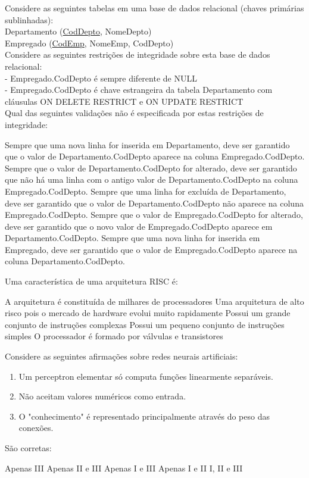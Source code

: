 \documentclass[12pt, addpoints]{exam}
\begin{document}
\begin{questions}
\question
Considere as seguintes tabelas em uma base de dados relacional (chaves primárias sublinhadas):\\
Departamento (\underline{CodDepto}, NomeDepto)\\
Empregado (\underline{CodEmp}, NomeEmp, CodDepto)\\
Considere as seguintes restrições de integridade sobre esta base de dados relacional:\\
- Empregado.CodDepto é sempre diferente de NULL\\
- Empregado.CodDepto é chave estrangeira da tabela Departamento com cláusulas ON DELETE RESTRICT e ON UPDATE RESTRICT\\
Qual das seguintes validações não é especificada por estas restrições de integridade:
\begin{choices}
\choice Sempre que uma nova linha for inserida em Departamento, deve ser garantido que o valor de Departamento.CodDepto aparece na coluna Empregado.CodDepto.
\choice Sempre que o valor de Departamento.CodDepto for alterado, deve ser garantido que não há uma linha com o antigo valor de Departamento.CodDepto na coluna Empregado.CodDepto.
\choice Sempre que uma linha for excluída de Departamento, deve ser garantido que o valor de Departamento.CodDepto não aparece na coluna Empregado.CodDepto.
\choice Sempre que o valor de Empregado.CodDepto for alterado, deve ser garantido que o novo valor de Empregado.CodDepto aparece em Departamento.CodDepto.
\choice Sempre que uma nova linha for inserida em Empregado, deve ser garantido que o valor de Empregado.CodDepto aparece na coluna Departamento.CodDepto.
\end{choices}

\question
Uma característica de uma arquitetura RISC é:
\begin{choices}
\choice A arquitetura é constituída de milhares de processadores
\choice Uma arquitetura de alto risco pois o mercado de hardware evolui muito rapidamente
\choice Possui um grande conjunto de instruções complexas
\choice Possui um pequeno conjunto de instruções simples
\choice O processador é formado por válvulas e transistores
\end{choices}

\question
Considere as seguintes afirmações sobre redes neurais artificiais: \begin{enumerate}[label=\Roman*.] \item Um perceptron elementar só computa funções linearmente separáveis. \item Não aceitam valores numéricos como entrada. \item O "conhecimento" é representado principalmente através do peso das conexões. \end{enumerate} São corretas:
\begin{choices}
\choice Apenas III
\choice Apenas II e III
\choice Apenas I e III
\choice Apenas I e II 
\choice I, II e III
\end{choices}



    \end{questions}
    
\end{document}

